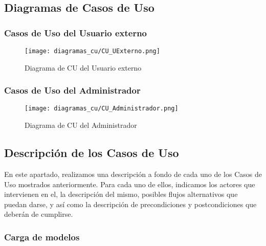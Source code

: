 \subsection{Diagramas de Casos de Uso}

\subsubsection{Casos de Uso del Usuario externo}

\begin{figure}[H]
    \begin{center}
        \texttt{[image: diagramas\_cu/CU\_UExterno.png]}
    \end{center}
    \caption{Diagrama de CU del Usuario externo}
    \label{fig:DCUAdministrador}
\end{figure}

\subsubsection{Casos de Uso del Administrador}

\begin{figure}[H]
    \begin{center}
        \texttt{[image: diagramas\_cu/CU\_Administrador.png]}
    \end{center}
    \caption{Diagrama de CU del Administrador}
    \label{fig:DCUAdministrador}
\end{figure}


\subsection{Descripción de los Casos de Uso}

En este apartado, realizamos una descripción a fondo de cada uno de los Casos de
Uso mostrados anteriormente. Para cada uno de ellos, indicamos los actores que
intervienen en el, la descripción del mismo, posibles flujos alternativos que
puedan darse, y así como la descripción de precondiciones y postcondiciones que
deberán de cumplirse.

\subsubsection{Carga de modelos}

